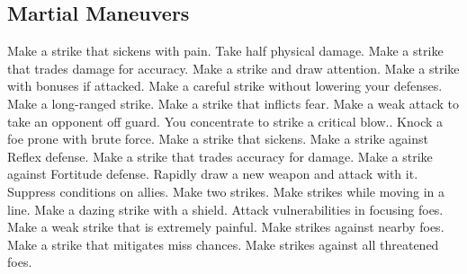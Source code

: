 \subsection{Martial Maneuvers}\label{Martial Maneuvers}
\begin{spelllist}
 Make a strike that sickens with pain.
 Take half physical damage.
 Make a strike that trades damage for accuracy.
 Make a strike and draw attention.
 Make a strike with bonuses if attacked.
 Make a careful strike without lowering your defenses.
 Make a long-ranged strike.
 Make a strike that inflicts fear.
 Make a weak attack to take an opponent off guard.
 You concentrate to strike a critical blow..
 Knock a foe prone with brute force.
 Make a strike that sickens.
 Make a strike against Reflex defense.
 Make a strike that trades accuracy for damage.
 Make a strike against Fortitude defense.
 Rapidly draw a new weapon and attack with it.
 Suppress conditions on allies.
 Make two strikes.
 Make strikes while moving in a line.
 Make a dazing strike with a shield.
 Attack vulnerabilities in focusing foes.
 Make a weak strike that is extremely painful.
 Make strikes against nearby foes.
 Make a strike that mitigates miss chances.
 Make strikes against all threatened foes.
\end{spelllist}



\small
